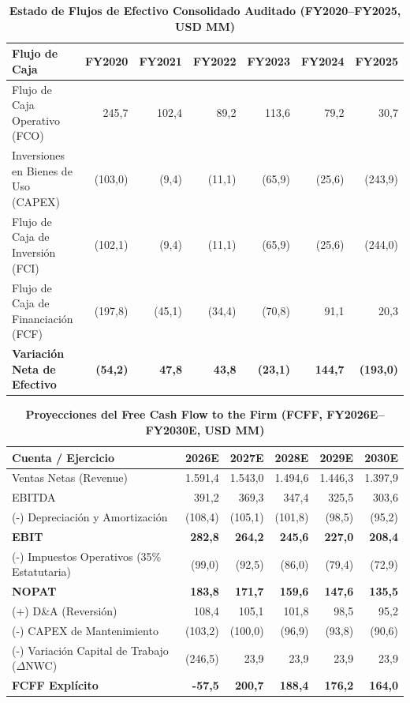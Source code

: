 \documentclass[10pt,a4paper]{article}
\begin{document}
\begin{table}[H]
\centering
\caption{\textbf{Estado de Flujos de Efectivo Consolidado Auditado (FY2020--FY2025, USD MM)}}
\scriptsize
\begin{tabularx}{\textwidth}{Xrrrrrr}
\toprule
\textbf{Flujo de Caja} & \textbf{FY2020} & \textbf{FY2021} & \textbf{FY2022} & \textbf{FY2023} & \textbf{FY2024} & \textbf{FY2025} \\
\midrule
Flujo de Caja Operativo (FCO) & 245,7 & 102,4 & 89,2 & 113,6 & 79,2 & 30,7 \\
Inversiones en Bienes de Uso (CAPEX) & (103,0) & (9,4) & (11,1) & (65,9) & (25,6) & (243,9) \\
Flujo de Caja de Inversión (FCI) & (102,1) & (9,4) & (11,1) & (65,9) & (25,6) & (244,0) \\
Flujo de Caja de Financiación (FCF) & (197,8) & (45,1) & (34,4) & (70,8) & 91,1 & 20,3 \\
\textbf{Variación Neta de Efectivo} & \textbf{(54,2)} & \textbf{47,8} & \textbf{43,8} & \textbf{(23,1)} & \textbf{144,7} & \textbf{(193,0)} \\
\bottomrule
\end{tabularx}
\end{table}

\begin{table}[H]
\centering
\caption{\textbf{Proyecciones del Free Cash Flow to the Firm (FCFF, FY2026E--FY2030E, USD MM)}}
\scriptsize
\begin{tabularx}{\textwidth}{Xrrrrr}
\toprule
\textbf{Cuenta / Ejercicio} & \textbf{2026E} & \textbf{2027E} & \textbf{2028E} & \textbf{2029E} & \textbf{2030E} \\
\midrule
Ventas Netas (Revenue) & 1.591,4 & 1.543,0 & 1.494,6 & 1.446,3 & 1.397,9 \\
EBITDA & 391,2 & 369,3 & 347,4 & 325,5 & 303,6 \\
(-) Depreciación y Amortización & (108,4) & (105,1) & (101,8) & (98,5) & (95,2) \\
\textbf{EBIT} & \textbf{282,8} & \textbf{264,2} & \textbf{245,6} & \textbf{227,0} & \textbf{208,4} \\
(-) Impuestos Operativos (35\% Estatutaria) & (99,0) & (92,5) & (86,0) & (79,4) & (72,9) \\
\textbf{NOPAT} & \textbf{183,8} & \textbf{171,7} & \textbf{159,6} & \textbf{147,6} & \textbf{135,5} \\
(+) D\&A (Reversión) & 108,4 & 105,1 & 101,8 & 98,5 & 95,2 \\
(-) CAPEX de Mantenimiento & (103,2) & (100,0) & (96,9) & (93,8) & (90,6) \\
(-) Variación Capital de Trabajo ($\Delta$NWC) & (246,5) & 23,9 & 23,9 & 23,9 & 23,9 \\
\midrule
\textbf{FCFF Explícito} & \textbf{-57,5} & \textbf{200,7} & \textbf{188,4} & \textbf{176,2} & \textbf{164,0} \\
\bottomrule
\end{tabularx}
\end{table}
\end{document}
